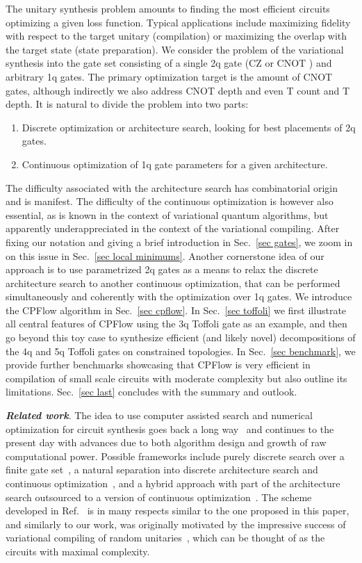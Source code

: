 \documentclass[draft, twocolumn, amsfonts, amssymb, aps, nofootinbib]{revtex4-2}
\newcommand{\CZ}{\textsf{CZ }}
\newcommand{\CX}{\textsf{CNOT }}
\newcommand{\T}{\textsf{T }}
\newcommand{\package}[1]{\textrm {#1 }}
\newcommand{\cpflow}{\package{CPFlow}}
\begin{document}
The unitary synthesis problem amounts to finding the most efficient circuits optimizing a given loss function. Typical applications include maximizing fidelity with respect to the target unitary (compilation) or maximizing the overlap with the target state (state preparation). We consider the problem of the variational synthesis into the gate set consisting of a single 2q gate (\CZ or \CX) and arbitrary 1q gates. The primary optimization target is the amount of \CX gates, although indirectly we also address \CX depth and even \T count and \T depth. It is natural to divide the problem into two parts:
\begin{enumerate}[label=(\roman*), nosep]
	\item Discrete optimization or architecture search, looking for best placements of 2q gates.
	\item Continuous optimization of 1q gate parameters for a given architecture.
\end{enumerate}
The difficulty associated with the architecture search has combinatorial origin and is manifest. The difficulty of the continuous optimization is however also essential, as is known in the context of variational quantum algorithms, but apparently underappreciated in the context of the variational compiling. After fixing our notation and giving a brief introduction in Sec.~\ref{sec gates}, we zoom in on this issue in Sec.~\ref{sec local minimums}. Another cornerstone idea of our approach is to use parametrized 2q gates as a means to relax the discrete architecture search to another continuous optimization, that can be performed simultaneously and coherently with the optimization over 1q gates. We introduce the \cpflow algorithm in Sec.~\ref{sec cpflow}. In Sec.~\ref{sec toffoli} we first illustrate all central features of \cpflow using the 3q Toffoli gate as an example, and then go beyond this toy case to synthesize efficient (and likely novel) decompositions of the 4q and 5q Toffoli gates on constrained topologies. In Sec.~\ref{sec benchmark}, we provide further benchmarks showcasing that \cpflow is very efficient in compilation of small scale circuits with moderate complexity but also outline its limitations. Sec.~\ref{sec last} concludes with the summary and outlook.

\textbf{\textit{Related work}}. The idea to use computer assisted search and numerical optimization for circuit synthesis goes back a long way~\cite{Divincenzo1994} and continues to the present day with advances due to both algorithm design and growth of raw computational power. Possible frameworks include purely discrete search over a finite gate set~\cite{Nagarajan2021}, a natural separation into discrete architecture search and continuous optimization~\cite{Nam2018, Khatri2019, Smith2021}, and a hybrid approach with part of the architecture search outsourced to a version of continuous optimization~\cite{Younis2021, Rakyta2022}. The scheme developed in Ref.~\cite{Rakyta2022} is in many respects similar to the one proposed in this paper, and similarly to our work, was originally motivated by the impressive success of variational compiling of random unitaries~\cite{Kiani2020, Madden2021, Rakyta2021}, which can be thought of as the circuits with maximal complexity.
\end{document}
